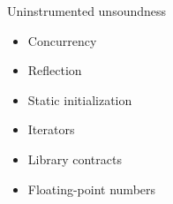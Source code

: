 \begin{frame}{Uninstrumented unsoundness}

\begin{itemize}
  \item Concurrency

  \vspace*{0.2cm}

  \item Reflection

  \vspace*{0.2cm}

  \item Static initialization

  \vspace*{0.2cm}

  \item Iterators

  \vspace*{0.2cm}

  \item Library contracts

  \vspace*{0.2cm}

  \item Floating-point numbers
\end{itemize}

\end{frame}
